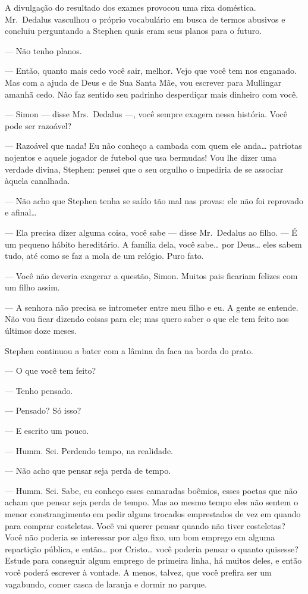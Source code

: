 A divulgação do resultado dos exames provocou uma rixa doméstica. 
Mr.~Dedalus vasculhou o próprio vocabulário em busca de termos
abusivos e concluiu perguntando a Stephen quais eram seus planos para o
futuro.

--- Não tenho planos.

--- Então, quanto mais cedo você sair, melhor.  Vejo que você tem
nos enganado.  Mas com a ajuda de Deus e de Sua Santa Mãe, vou escrever
para Mullingar amanhã cedo.  Não faz sentido seu padrinho desperdiçar
mais dinheiro com você.

--- Simon --- disse Mrs.~Dedalus ---, você sempre exagera nessa
história.  Você pode ser razoável?

--- Razoável que nada!  Eu não conheço a cambada com quem ele
anda\ldots{} patriotas nojentos e aquele jogador de futebol que usa
bermudas!  Vou lhe dizer uma verdade divina, Stephen: pensei que o seu
orgulho o impediria de se associar àquela canalhada.

--- Não acho que Stephen tenha se saído tão mal nas provas: ele
não foi reprovado e afinal\ldots{}

--- Ela precisa dizer alguma coisa, você sabe --- disse 
Mr.~Dedalus ao filho.  --- É um pequeno hábito hereditário.  A família dela,
você sabe\ldots{} por Deus\ldots{} eles sabem tudo, até como se faz a mola de um
relógio.  Puro fato.

--- Você não deveria exagerar a questão, Simon.  Muitos pais
ficariam felizes com um filho assim.

--- A senhora não precisa se intrometer entre meu filho e eu.  A
gente se entende.  Não vou ficar dizendo coisas para ele; mas quero
saber o que ele tem feito nos últimos doze meses.

Stephen continuou a bater com a lâmina da faca na borda do prato.

--- O que você tem feito?

--- Tenho pensado.

--- Pensado?  Só isso?

--- E escrito um pouco.

--- Humm.  Sei.  Perdendo tempo, na realidade.

--- Não acho que pensar seja perda de tempo.

--- Humm.  Sei.  Sabe, eu conheço esses camaradas boêmios, esses
poetas que não acham que pensar seja perda de tempo.  Mas ao mesmo
tempo eles não sentem o menor constrangimento em pedir alguns trocados
emprestados de vez em quando para comprar costeletas.  Você vai querer
pensar quando não tiver costeletas?  Você não poderia se interessar por
algo fixo, um bom emprego em alguma repartição pública, e então\ldots{} por
Cristo\ldots{} você poderia pensar o quanto quisesse?  Estude para conseguir
algum emprego de primeira linha, há muitos deles, e então você poderá
escrever à vontade.  A menos, talvez, que você prefira ser um
vagabundo, comer casca de laranja e dormir no parque.


